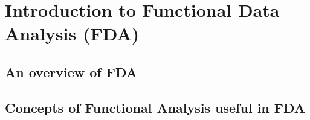 \chapter{Introduction to Functional Data Analysis (FDA)}

\section{An overview of FDA}
\section{Concepts of Functional Analysis useful in FDA}
